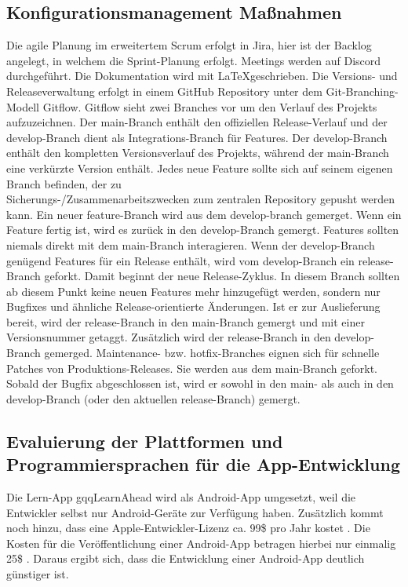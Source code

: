 \subsection{Konfigurationsmanagement Maßnahmen}
Die agile Planung im erweitertem Scrum erfolgt in Jira, hier ist der Backlog angelegt, in welchem die Sprint-Planung erfolgt. Meetings werden auf Discord durchgeführt. Die Dokumentation wird mit \LaTeX  geschrieben.\newline
Die Versions- und Releaseverwaltung erfolgt in einem GitHub Repository unter dem Git-Branching-Modell Gitflow. Gitflow sieht zwei Branches vor um den Verlauf des Projekts aufzuzeichnen. Der main-Branch enthält den offiziellen Release-Verlauf und der develop-Branch dient als Integrations-Branch für Features. Der develop-Branch enthält den kompletten Versionsverlauf des Projekts, während der main-Branch eine verkürzte Version enthält.\newline
Jedes neue Feature sollte sich auf seinem eigenen Branch befinden, der zu \\ Sicherungs-/Zusammenarbeitszwecken zum zentralen Repository gepusht werden kann. Ein neuer feature-Branch  wird aus dem develop-branch gemerget. Wenn ein Feature fertig ist, wird es zurück in den develop-Branch gemergt. Features sollten niemals direkt mit dem main-Branch interagieren.\newline
Wenn der develop-Branch genügend Features für ein Release enthält, wird vom develop-Branch ein release-Branch geforkt. Damit beginnt der neue Release-Zyklus. In diesem Branch sollten ab diesem Punkt keine neuen Features mehr hinzugefügt werden, sondern nur Bugfixes und ähnliche Release-orientierte Änderungen. Ist er zur Auslieferung bereit, wird der release-Branch in den main-Branch gemergt und mit einer Versionsnummer getaggt. Zusätzlich wird der release-Branch in den develop-Branch gemerged. \newline
Maintenance- bzw. hotfix-Branches eignen sich für schnelle Patches von Produktions-Releases. Sie werden aus dem main-Branch geforkt. Sobald der Bugfix abgeschlossen ist, wird er sowohl in den main- als auch in den develop-Branch (oder den aktuellen release-Branch) gemergt.
\subsection{Evaluierung der Plattformen und Programmiersprachen für die App-Entwicklung
}
Die Lern-App gqq{LearnAhead} wird als Android-App umgesetzt, weil die Entwickler selbst nur Android-Geräte zur Verfügung haben. Zusätzlich kommt noch hinzu, dass eine Apple-Entwickler-Lizenz ca. 99\$ pro Jahr kostet \cite{noauthor_registrierung_nodate}. Die Kosten für die Veröffentlichung einer Android-App betragen hierbei nur einmalig 25\$ \cite {appsoluts_unterschied_2016}. Daraus ergibt sich, dass die Entwicklung einer Android-App deutlich günstiger ist. \\

